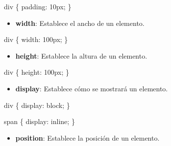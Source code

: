 \documentclass[
  a4paper,
  DIV=11,
  numbers=noendperiod,
  onepage,
  openany]{scrreprt}
\newenvironment{Shaded}{\begin{snugshade}}{\end{snugshade}}
\newcommand{\DataTypeTok}[1]{\textcolor[rgb]{0.68,0.00,0.00}{#1}}
\newcommand{\DecValTok}[1]{\textcolor[rgb]{0.68,0.00,0.00}{#1}}
\newcommand{\KeywordTok}[1]{\textcolor[rgb]{0.00,0.23,0.31}{#1}}
\newcommand{\NormalTok}[1]{\textcolor[rgb]{0.00,0.23,0.31}{#1}}
\newcommand{\OperatorTok}[1]{\textcolor[rgb]{0.37,0.37,0.37}{#1}}
\providecommand{\tightlist}{%
  \setlength{\itemsep}{0pt}\setlength{\parskip}{0pt}}\usepackage{longtable,booktabs,array}
\begin{document}
\begin{Shaded}
\begin{Highlighting}[]
\NormalTok{div \{}
  \KeywordTok{padding}\NormalTok{: }\DecValTok{10}\DataTypeTok{px}\OperatorTok{;}
\NormalTok{\}}
\end{Highlighting}
\end{Shaded}

\begin{itemize}
\tightlist
\item
  \textbf{width}: Establece el ancho de un elemento.
\end{itemize}

\begin{Shaded}
\begin{Highlighting}[]
\NormalTok{div \{}
  \KeywordTok{width}\NormalTok{: }\DecValTok{100}\DataTypeTok{px}\OperatorTok{;}
\NormalTok{\}}
\end{Highlighting}
\end{Shaded}

\begin{itemize}
\tightlist
\item
  \textbf{height}: Establece la altura de un elemento.
\end{itemize}

\begin{Shaded}
\begin{Highlighting}[]
\NormalTok{div \{}
  \KeywordTok{height}\NormalTok{: }\DecValTok{100}\DataTypeTok{px}\OperatorTok{;}
\NormalTok{\}}
\end{Highlighting}
\end{Shaded}

\begin{itemize}
\tightlist
\item
  \textbf{display}: Establece cómo se mostrará un elemento.
\end{itemize}

\begin{Shaded}
\begin{Highlighting}[]
\NormalTok{div \{}
  \KeywordTok{display}\NormalTok{: }\DecValTok{block}\OperatorTok{;}
\NormalTok{\}}

\NormalTok{span \{}
  \KeywordTok{display}\NormalTok{: }\DecValTok{inline}\OperatorTok{;}
\NormalTok{\}}
\end{Highlighting}
\end{Shaded}

\begin{itemize}
\tightlist
\item
  \textbf{position}: Establece la posición de un elemento.
\end{itemize}
\end{document}
